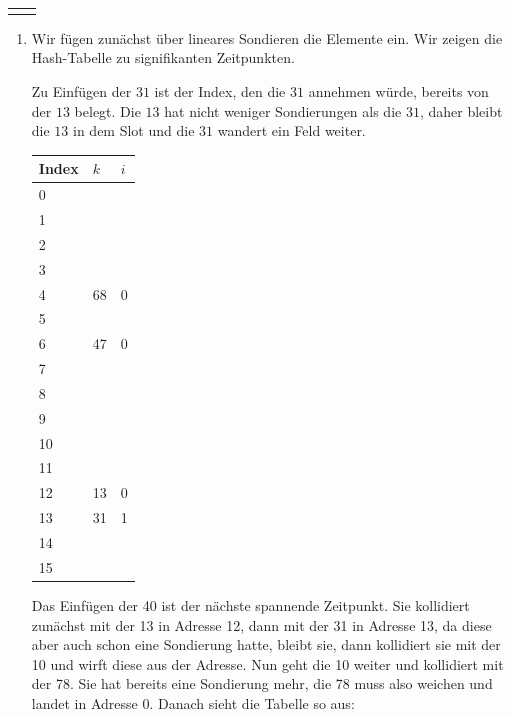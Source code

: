 \documentclass{scrartcl} %
\makeatletter
\newcommand{\headvorlage}{	
	\group{24} \hfill \textbf{\semester} \\
	\begin{tabular}{@{}l r}
		\student{Philine Stella Bock}{507316}
		\student{Devagya Sharma}{495395}
		\student{Simon Seemüller}{513084}
	\end{tabular}
	\haloesung{09}
}
\makeatother
\begin{document}
	\headvorlage 
    \begin{aufgabe}
    
    \end{aufgabe}
    \begin{aufgabe}
        \begin{enumerate}[label=(\alph*)]
            \item Wir fügen zunächst über lineares Sondieren die Elemente ein. Wir zeigen die Hash-Tabelle zu signifikanten Zeitpunkten.

            Zu Einfügen der $31$ ist der Index, den die $31$ annehmen würde, bereits von der $13$ belegt. Die $13$ hat nicht weniger Sondierungen als die $31$, daher bleibt die $13$ in dem Slot und die $31$ wandert ein Feld weiter.
            \begin{center}
                \begin{tabular}{|m{2cm}|m{1cm}<{\centering}|m{1cm}<{\centering}|}
                \hline
                     \rowcolor{teal!60} Index & $k$& $i$\\\hline
                     0 & & \\
                     1 & & \\
                     2 & & \\
                     3 & & \\
                     4 & 68 & 0\\
                     5 & & \\
                     6 & 47 & 0\\
                     7 & & \\
                     8 & & \\
                     9 & & \\
                     10 & & \\
                     11 & & \\
                     12 & 13 & 0\\
                     13 & 31 & 1\\
                     14 & & \\
                     15 & & \\\hline 
                \end{tabular}
            \end{center}
            Das Einfügen der 40 ist der nächste spannende Zeitpunkt. Sie kollidiert zunächst mit der 13 in Adresse 12, dann mit der 31 in Adresse 13, da diese aber auch schon eine Sondierung hatte, bleibt sie, dann kollidiert sie mit der 10 und wirft diese aus der Adresse. Nun geht die 10 weiter und kollidiert mit der 78. Sie hat bereits eine Sondierung mehr, die 78 muss also weichen und landet in Adresse 0. Danach sieht die Tabelle so aus:

\end{enumerate}
\end{aufgabe}
\end{document}
